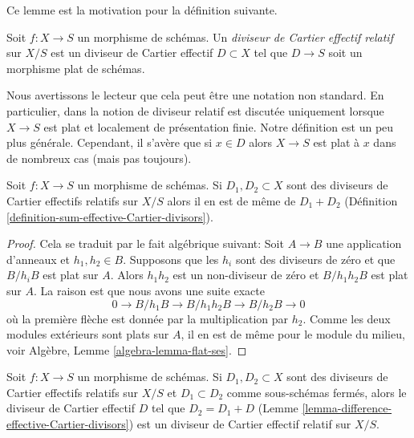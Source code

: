 \noindent
Ce lemme est la motivation pour la définition suivante.

\begin{definition}
\label{definition-relative-effective-Cartier-divisor}
Soit  $f : X \to S$  un morphisme de schémas. Un  {\it  diviseur de
Cartier effectif relatif}  sur  $X/S$  est un diviseur de Cartier
effectif  $D \subset X$  tel que  $D \to S$  soit un morphisme plat de schémas.
\end{definition}

\noindent
Nous avertissons le lecteur que cela peut être une notation non standard. En
particulier, dans  \cite[IV, section 21.15]{EGA}  la notion de diviseur relatif est discutée
uniquement lorsque  $X \to S$  est plat et localement de présentation finie.
Notre définition est un peu plus générale. Cependant, il s'avère que si
 $x \in D$  alors  $X \to S$  est plat à  $x$  dans de nombreux cas (mais
pas toujours).

\begin{lemma}
\label{lemma-sum-relative-effective-Cartier-divisor}
Soit  $f : X \to S$  un morphisme de schémas. Si  $D_1, D_2 \subset X$  sont des diviseurs de
Cartier effectifs relatifs sur  $X/S$  alors il en est de même de
 $D_1 + D_2$  (Définition  \ref{definition-sum-effective-Cartier-divisors}).
\end{lemma}

\begin{proof}
Cela se traduit par le fait algébrique suivant: Soit  $A \to B$  une application
d'anneaux et  $h_1, h_2 \in B$. Supposons que les  $h_i$  sont des diviseurs de
zéro et que  $B/h_iB$  est plat sur  $A$. Alors  $h_1h_2$  est un
non-diviseur de zéro et  $B/h_1h_2B$  est plat sur  $A$. La raison est que
nous avons une suite exacte
$$
0 \to B/h_1B \to B/h_1h_2B \to B/h_2B \to 0
$$
où la première flèche est donnée par la multiplication par  $h_2$. Comme les
deux modules extérieurs sont plats sur  $A$, il en est de même pour le
module du milieu, voir Algèbre, Lemme  \ref{algebra-lemma-flat-ses}.
\end{proof}

\begin{lemma}
\label{lemma-difference-relative-effective-Cartier-divisor}
Soit  $f : X \to S$  un morphisme de schémas. Si  $D_1, D_2 \subset X$  sont des diviseurs de
Cartier effectifs relatifs sur  $X/S$  et  $D_1 \subset D_2$  comme sous-schémas
fermés, alors le diviseur de Cartier effectif  $D$  tel que  $D_2 = D_1 + D$ 
(Lemme  \ref{lemma-difference-effective-Cartier-divisors}) est un diviseur de Cartier effectif relatif sur  $X/S$.
\end{lemma}

